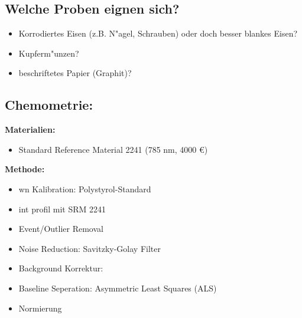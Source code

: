 \subsection*{Welche Proben eignen sich?}

\begin{itemize}
    \item Korrodiertes Eisen (z.B. N"agel, Schrauben) oder doch besser blankes Eisen?
    \item Kupferm"unzen?
    \item beschriftetes Papier (Graphit)?
\end{itemize}




\subsection*{Chemometrie:}

\textbf{Materialien:}
\begin{itemize}
    \item Standard Reference Material 2241 (785 nm, 4000 €)
\end{itemize}

\textbf{Methode:}
\begin{itemize}
    \item wn Kalibration: Polystyrol-Standard
    \item int profil mit SRM 2241
    \item Event/Outlier Removal
    \item Noise Reduction: Savitzky-Golay Filter
    \item Background Korrektur: 
    \item Baseline Seperation: Asymmetric Least Squares (ALS)
    \item Normierung
\end{itemize}

